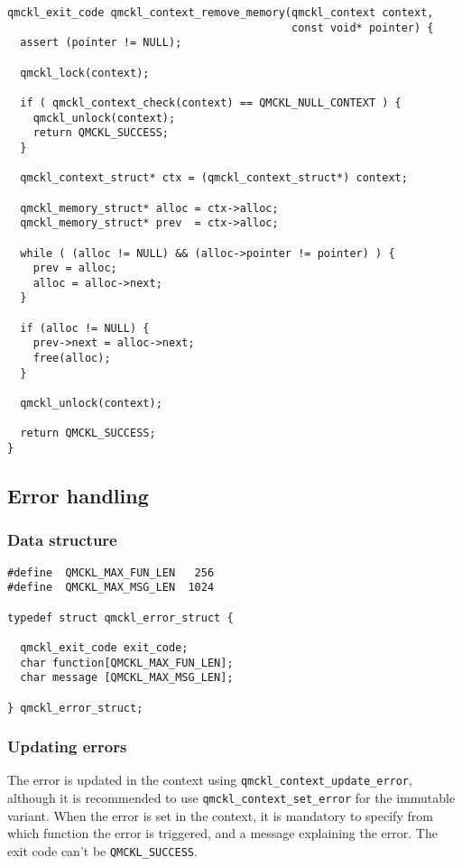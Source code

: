 \begin{verbatim}
qmckl_exit_code qmckl_context_remove_memory(qmckl_context context,
                                            const void* pointer) {
  assert (pointer != NULL);

  qmckl_lock(context);

  if ( qmckl_context_check(context) == QMCKL_NULL_CONTEXT ) {
    qmckl_unlock(context);
    return QMCKL_SUCCESS;
  }

  qmckl_context_struct* ctx = (qmckl_context_struct*) context; 

  qmckl_memory_struct* alloc = ctx->alloc;
  qmckl_memory_struct* prev  = ctx->alloc;

  while ( (alloc != NULL) && (alloc->pointer != pointer) ) {
    prev = alloc;
    alloc = alloc->next;
  }
  
  if (alloc != NULL) {
    prev->next = alloc->next;
    free(alloc);
  } 
      
  qmckl_unlock(context);

  return QMCKL_SUCCESS;
}
\end{verbatim}

\subsection{Error handling}
\label{sec:orgd61ab50}

\subsubsection{Data structure}
\label{sec:org31be6ee}

\begin{verbatim}
#define  QMCKL_MAX_FUN_LEN   256
#define  QMCKL_MAX_MSG_LEN  1024

typedef struct qmckl_error_struct {

  qmckl_exit_code exit_code;
  char function[QMCKL_MAX_FUN_LEN];
  char message [QMCKL_MAX_MSG_LEN];

} qmckl_error_struct;
\end{verbatim}

\subsubsection{Updating errors}
\label{sec:orgb2ce614}

The error is updated in the context using
\texttt{qmckl\_context\_update\_error}, although it is recommended to use
\texttt{qmckl\_context\_set\_error} for the immutable variant.
When the error is set in the context, it is mandatory to specify
from which function the error is triggered, and a message
explaining the error. The exit code can't be \texttt{QMCKL\_SUCCESS}.

